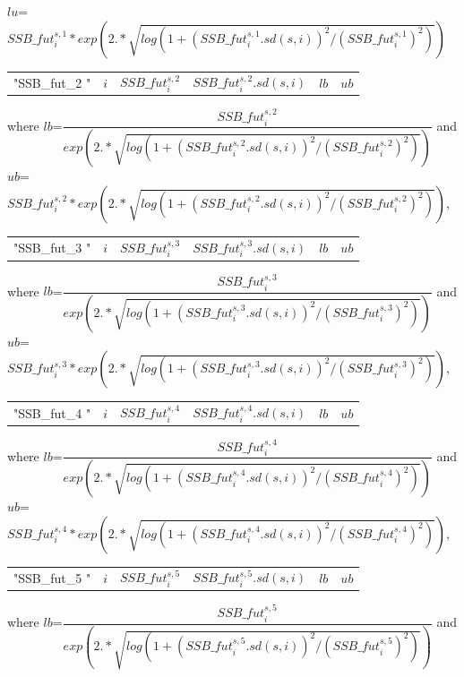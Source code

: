 \documentclass{article}
\begin{document}
\begin{itemize}
$lu$=${SSB\_fut^{s,1}_i}*{exp\left(2.*\sqrt{log(1+{(SSB\_fut^{s,1}_i.sd(s,i))}^2/{(SSB\_fut^{s,1}_i)}^2)}\right)}$ 

\begin{center}
    \begin{tabular}{c c c c c c}
"SSB\_fut\_2 "    & $i$ &  $SSB\_fut^{s,2}_i$ & $SSB\_fut^{s,2}_i.sd(s,i)$ & $lb$ & $ub$\\ \end{tabular}
\end{center}
where $lb$=$\dfrac{SSB\_fut^{s,2}_i}{exp\left(2.*\sqrt{log(1+{(SSB\_fut^{s,2}_i.sd(s,i))}^2/{(SSB\_fut^{s,2}_i)}^2)}\right)}$ and \\

$ub$=${SSB\_fut^{s,2}_i}*{exp\left(2.*\sqrt{log(1+{(SSB\_fut^{s,2}_i.sd(s,i))}^2/{(SSB\_fut^{s,2}_i)}^2)}\right)}$,

\begin{center}
    \begin{tabular}{c c c c c c}
"SSB\_fut\_3 "    & $i$ &  $SSB\_fut^{s,3}_i$ & $SSB\_fut^{s,3}_i.sd(s,i)$ & $lb$ & $ub$\\ \end{tabular}
\end{center}
where $lb$=$\dfrac{SSB\_fut^{s,3}_i}{exp\left(2.*\sqrt{log(1+{(SSB\_fut^{s,3}_i.sd(s,i))}^2/{(SSB\_fut^{s,3}_i)}^2)}\right)}$ and \\

$ub$=${SSB\_fut^{s,3}_i}*{exp\left(2.*\sqrt{log(1+{(SSB\_fut^{s,3}_i.sd(s,i))}^2/{(SSB\_fut^{s,3}_i)}^2)}\right)}$,

\begin{center}
    \begin{tabular}{c c c c c c}
"SSB\_fut\_4 "    & $i$ &  $SSB\_fut^{s,4}_i$ & $SSB\_fut^{s,4}_i.sd(s,i)$ & $lb$ & $ub$\\ \end{tabular}
\end{center}
where $lb$=$\dfrac{SSB\_fut^{s,4}_i}{exp\left(2.*\sqrt{log(1+{(SSB\_fut^{s,4}_i.sd(s,i))}^2/{(SSB\_fut^{s,4}_i)}^2)}\right)}$ and \\

$ub$=${SSB\_fut^{s,4}_i}*{exp\left(2.*\sqrt{log(1+{(SSB\_fut^{s,4}_i.sd(s,i))}^2/{(SSB\_fut^{s,4}_i)}^2)}\right)}$,


\begin{center}
    \begin{tabular}{c c c c c c}
"SSB\_fut\_5 "    & $i$ &  $SSB\_fut^{s,5}_i$ & $SSB\_fut^{s,5}_i.sd(s,i)$ & $lb$ & $ub$\\ \end{tabular}
\end{center}
where $lb$=$\dfrac{SSB\_fut^{s,5}_i}{exp\left(2.*\sqrt{log(1+{(SSB\_fut^{s,5}_i.sd(s,i))}^2/{(SSB\_fut^{s,5}_i)}^2)}\right)}$ and \\


\end{itemize}
\end{document}
